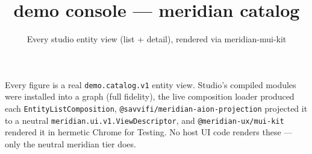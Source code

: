 \documentclass[10pt]{article}
\title{\textbf{demo console} — meridian catalog}
\author{Every studio entity view (list + detail), rendered via meridian-mui-kit}
\date{}
\begin{document}
\maketitle

\noindent
Every figure is a real \texttt{demo.catalog.v1} entity view. Studio's compiled
modules were installed into a graph (full fidelity), the live composition loader
produced each \texttt{EntityListComposition}, \texttt{@savvifi/meridian-aion-projection}
projected it to a neutral \texttt{meridian.ui.v1.ViewDescriptor}, and
\texttt{@meridian-ux/mui-kit} rendered it in hermetic Chrome for Testing.
No host UI code renders these — only the neutral meridian tier does.

\vspace{1em}
\tableofcontents
\clearpage


\end{document}
